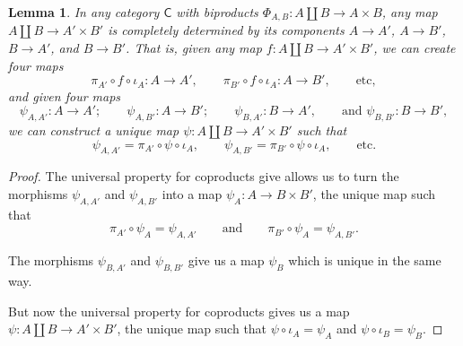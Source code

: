 \documentclass[a4paper]{report}
\theoremstyle{definition}
\theoremstyle{plain}
\newtheorem{lemma}{Lemma}[section]
\theoremstyle{remark}
\begin{document}
\begin{lemma}
  \label{lemma:mapcoprodtoproddeterminedbycomponents}
  In any category $\mathsf{C}$ with biproducts $\Phi_{A, B}\colon A \amalg B \to A \times B$, any map $A \amalg B \to A' \times B'$ is completely determined by its components $A \to A'$, $A \to B'$, $B \to A'$, and $B \to B'$. That is, given any map $f\colon A \amalg B \to A' \times B'$, we can create four maps
  \begin{equation*}
    \pi_{A'} \circ f \circ \iota_{A}\colon A \to A', \qquad \pi_{B'} \circ f \circ \iota_{A}\colon A \to B',\qquad\text{etc},
  \end{equation*}
  and given four maps
  \begin{equation*}
    \psi_{A, A'}\colon A \to A';\qquad \psi_{A, B'}\colon A \to B';\qquad \psi_{B,A'}\colon B \to A',\qquad\text{and } \psi_{B,B'}\colon B \to B',
  \end{equation*}
  we can construct a unique map $\psi\colon A \amalg B \to A' \times B'$ such that
  \begin{equation*}
    \psi_{A, A'} = \pi_{A'} \circ \psi \circ \iota_{A},\qquad \psi_{A,B'} = \pi_{B'} \circ \psi \circ \iota_{A},\qquad\text{etc}.
  \end{equation*}
\end{lemma}
\begin{proof}
  The universal property for coproducts give allows us to turn the morphisms $\psi_{A,A'}$ and $\psi_{A, B'}$ into a map $\psi_{A}\colon A \to B \times B'$, the unique map such that 
  \begin{equation*}
    \pi_{A'} \circ \psi_{A} = \psi_{A,A'} \qquad\text{and}\qquad\pi_{B'} \circ \psi_{A} = \psi_{A,B'}.
  \end{equation*}

  The morphisms $\psi_{B,A'}$ and $\psi_{B,B'}$ give us a map $\psi_{B}$ which is unique in the same way.

  But now the universal property for coproducts gives us a map $\psi\colon A \amalg B \to A' \times B'$, the unique map such that $\psi \circ \iota_{A} = \psi_{A}$ and $\psi \circ \iota_{B} = \psi_{B}$.
\end{proof}
\end{document}
